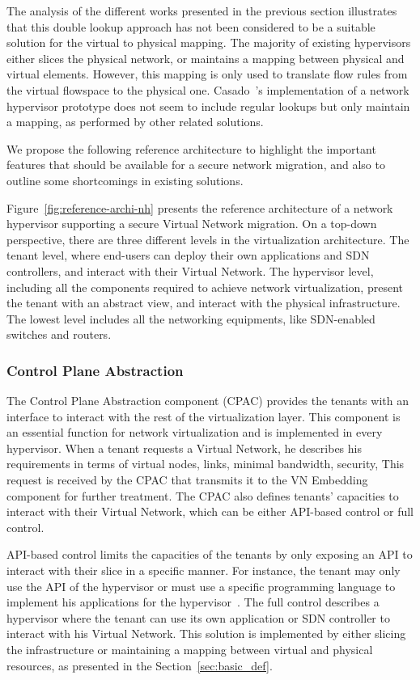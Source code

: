 The analysis of the different works presented in the previous section illustrates that this double lookup approach has not been considered to be a suitable solution for the virtual to physical mapping. The majority of existing hypervisors either slices the physical network, or maintains a mapping between physical and virtual elements. However, this mapping is only used to translate flow rules from the virtual flowspace to the physical one. Casado~\etal's  implementation of a network hypervisor prototype does not seem to include regular lookups but only maintain a mapping, as performed by other related solutions.

We propose the following reference architecture to highlight the important features that should be available for a secure network migration, and also to outline some shortcomings in existing solutions.


  
Figure~\ref{fig:reference-archi-nh} presents the reference architecture of a network hypervisor supporting a secure Virtual Network migration.
On a top-down perspective, there are three different levels in the virtualization architecture.
The tenant level, where end-users can deploy their own applications and SDN controllers, and interact with their Virtual Network.
The hypervisor level, including all the components required to achieve network virtualization, present the tenant with an abstract view, and interact with the physical infrastructure.
The lowest level includes all the networking equipments, like SDN-enabled switches and routers.

\subsubsection{Control Plane Abstraction}
The Control Plane Abstraction component (CPAC) provides the tenants with an interface to interact with the rest of the virtualization layer.
This component is an essential function for network virtualization and is implemented in every hypervisor.
When a tenant requests a Virtual Network, he describes his requirements in terms of virtual nodes, links, minimal bandwidth, security, \etc This request is received by the CPAC that transmits it to the VN Embedding component for further treatment.
The CPAC also defines tenants' capacities to interact with their Virtual Network, which can be either API-based control or full control.

API-based control limits the capacities of the tenants by only exposing an API to interact with their slice in a specific manner. For instance, the tenant may only use the API of the hypervisor or must use a specific programming language to implement his applications for the hypervisor~\cite{CompositionalHypervisor-Jin2014,NetworkHypervisor-Huang2013}. 
The full control describes a hypervisor where the tenant can use its own application or SDN controller to interact with his Virtual Network. This solution is implemented by either slicing the infrastructure or maintaining a mapping between virtual and physical resources, as presented in the Section~\ref{sec:basic_def}.



